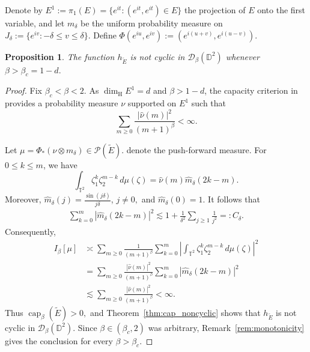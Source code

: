 \documentclass[a4paper,12pt]{amsart}
\newtheorem{prop}[thm]{Proposition}
\theoremstyle{definition}
\begin{document}
Denote by
$
    E^1:=\pi_1(E)
    =\{e^{it}:(e^{it},e^{it})\in E\}$
the projection of $E$ onto the first variable, and let $m_\delta$ be
the uniform probability measure on
$
    J_\delta:=\{e^{iv}:-\delta\leq v\leq\delta\}.
$
Define
$
    \Phi(e^{iu},e^{iv})
    :=(e^{i(u+v)},e^{i(u-v)}).
$

\begin{prop}\label{prop:case1-noncyclicity}
The function $h_{\widetilde E}$ is not cyclic in
$\mathcal D_\beta(\mathbb D^2)$ whenever
$
    \beta>\beta_c=1-d.
$
\end{prop}

\begin{proof}
Fix
$
    \beta_c<\beta <2.
$
As $\dim_{\mathrm H}E^1=d$ and $\beta>1-d$, the capacity criterion in
\cite[Section~1 and Theorem~4.3]{ELFALLAH2010_Cantor} provides a
probability measure $\nu$ supported on $E^1$ such that
\[
    \sum_{m\geq0}
    \frac{|\widehat\nu(m)|^2}{(m+1)^\beta}<\infty.
\]

Let
$
    \mu=\Phi_*(\nu\otimes m_\delta)
    \in\mathcal P(\widetilde E).
$
denote the push-forward measure. 
For $0\leq k\leq m$, we have
\[
    \int_{\mathbb T^2}
    \zeta_1^k\zeta_2^{m-k}\,d\mu(\zeta)
    =
    \widehat\nu(m)\widehat m_\delta(2k-m).
\]
Moreover,
$
    \widehat m_\delta(j)
    =\frac{\sin(j\delta)}{j\delta}$, $j\neq0,
$
and $\widehat m_\delta(0)=1$. It follows that
\[
\begin{aligned}
    \sum_{k=0}^m
    \left|\widehat m_\delta(2k-m)\right|^2
    \lesssim
    1+\frac{1}{\delta^2}\sum_{j\geq1}\frac{1}{j^2}
    =:C_\delta.
\end{aligned}
\]
Consequently,
\[
\begin{aligned}
    I_\beta[\mu]
    &\asymp
    \sum_{m\geq0}\frac{1}{(m+1)^\beta}
    \sum_{k=0}^m
    \left|
    \int_{\mathbb T^2}
    \zeta_1^k\zeta_2^{m-k}\,d\mu(\zeta)
    \right|^2 \\
    &=
    \sum_{m\geq0}
    \frac{|\widehat\nu(m)|^2}{(m+1)^\beta}
    \sum_{k=0}^m
    \left|\widehat m_\delta(2k-m)\right|^2 \\
    &\lesssim
    \sum_{m\geq0}
    \frac{|\widehat\nu(m)|^2}{(m+1)^\beta}
    <\infty.
\end{aligned}
\]
Thus
$
    \operatorname{cap}_\beta(\widetilde E)>0,
$
and Theorem~\ref{thm:cap_noncyclic} shows that
$h_{\widetilde E}$ is not cyclic in $\mathcal D_\beta(\mathbb D^2)$. Since $\beta\in(\beta_c,2)$ was arbitrary,
Remark~\ref{rem:monotonicity} gives the conclusion for every
$\beta>\beta_c$.
\end{proof}
\end{document}
